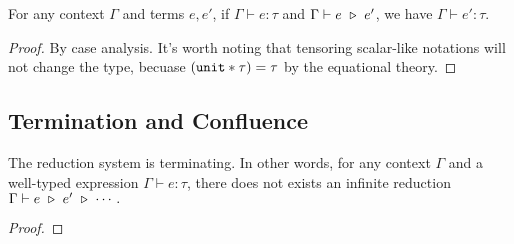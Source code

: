 \begin{lemma}
  For any context $\Gamma$ and terms $e, e'$, if $\Gamma \vdash e : \tau$ and $\Gamma \vdash e \ \triangleright\  e'$, we have
  $ \Gamma \vdash e' : \tau $. 
\end{lemma}
\begin{proof}
  By case analysis. It's worth noting that tensoring scalar-like notations will not change the type, becuase $(\texttt{unit} * \tau) = \tau$ by the equational theory.
\end{proof}

\subsection{Termination and Confluence}

\begin{lemma}[termination]
  The reduction system is terminating. In other words, for any context $\Gamma$ and a well-typed expression $\Gamma \vdash e : \tau$, there does not exists an infinite reduction $\Gamma \vdash e \ \triangleright\  e' \ \triangleright\ \cdots .$
\end{lemma}
\begin{proof}
\end{proof}


